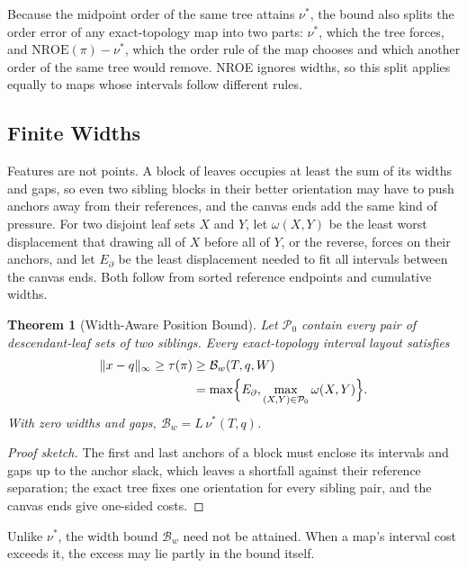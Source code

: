 \documentclass[preprint]{vgtc}   %
\newtheorem{theorem}{Theorem}
\newcommand{\nroe}{\mathrm{NROE}}
\begin{document}
Because the midpoint order of the same tree attains $\nu^*$, the bound also splits the order error of any exact-topology map into two parts: $\nu^*$, which the tree forces, and $\nroe(\pi)-\nu^*$, which the order rule of the map chooses and which another order of the same tree would remove. NROE ignores widths, so this split applies equally to maps whose intervals follow different rules.

\subsection{Finite Widths}
Features are not points. A block of leaves occupies at least the sum of its widths and gaps, so even two sibling blocks in their better orientation may have to push anchors away from their references, and the canvas ends add the same kind of pressure. For two disjoint leaf sets $X$ and $Y$, let $\omega(X,Y)$ be the least worst displacement that drawing all of $X$ before all of $Y$, or the reverse, forces on their anchors, and let $E_\partial$ be the least displacement needed to fit all intervals between the canvas ends. Both follow from sorted reference endpoints and cumulative widths.
\begin{theorem}[Width-Aware Position Bound]\label{thm:width}
Let $\mathcal{P}_0$ contain every pair of descendant-leaf sets of two siblings. Every exact-topology interval layout satisfies
\begin{equation}\label{eq:widthbound}
\begin{aligned}
 \|x-q\|_\infty\ge\tau(\pi)&\ge\mathcal{B}_w(T,q,W)\\
 &=\max\Bigl\{E_\partial,\max_{(X,Y)\in\mathcal{P}_0}\omega(X,Y)\Bigr\}.
\end{aligned}
\end{equation}
With zero widths and gaps, $\mathcal{B}_w=L\,\nu^*(T,q)$.
\end{theorem}
\begin{proof}[Proof sketch]
The first and last anchors of a block must enclose its intervals and gaps up to the anchor slack, which leaves a shortfall against their reference separation; the exact tree fixes one orientation for every sibling pair, and the canvas ends give one-sided costs.
\end{proof}
Unlike $\nu^*$, the width bound $\mathcal{B}_w$ need not be attained. When a map's interval cost exceeds it, the excess may lie partly in the bound itself.
\end{document}
